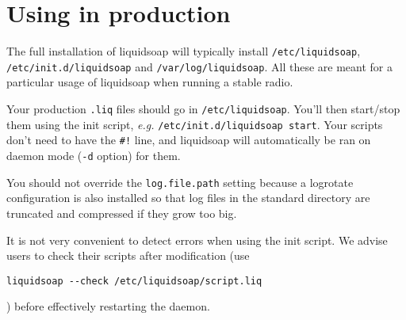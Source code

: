 \section{Using in production}
The full installation of liquidsoap will typically install
\verb+/etc/liquidsoap+, \verb+/etc/init.d/liquidsoap+ and \verb+/var/log/liquidsoap+.
All these are meant for a particular usage of liquidsoap
when running a stable radio.

Your production \verb+.liq+ files should go in \verb+/etc/liquidsoap+.
You'll then start/stop them using the init script, \emph{e.g.}
\verb+/etc/init.d/liquidsoap start+.
Your scripts don't need to have the \verb+#!+ line,
and liquidsoap will automatically be ran on daemon mode (\verb+-d+ option) for them.

You should not override the \verb+log.file.path+ setting because a
logrotate configuration is also installed so that log files
in the standard directory are truncated and compressed if they grow too big.

It is not very convenient to detect errors when using the init script.
We advise users to check their scripts after modification (use
\begin{verbatim}
liquidsoap --check /etc/liquidsoap/script.liq
\end{verbatim}
)
before effectively restarting the daemon.


